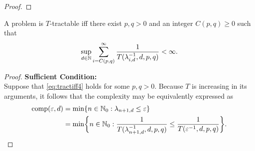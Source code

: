 \documentclass[11pt,a4paper]{article}
\begin{document}
{\begin{proof}
\end{proof}
\bigskip
\begin{theorem}\label{thm_main_strong_tract2} 
A problem is $T$-tractable iff there exist $p,q>0$ and an integer $C(p,q) \ge 0$ such that
\begin{equation} \label{eq:tractiff4}
     \sup_{d \in \mathbb{N}} \sum_{i = C(p,q)}^\infty \frac{1}{T(\lambda^{-1}_{i,d},d,p,q)}< \infty.
\end{equation}

\end{theorem}

\begin{proof}
    \textbf{Sufficient Condition:}\\ Suppose that \eqref{eq:tractiff4} holds for some $p,q>0$. 
Because $T$ is increasing in its arguments, it follows that the complexity may be equivalently expressed as 
\begin{align*}
    \operatorname{comp}(\varepsilon, d) &= \min \{n \in \mathbb{N}_{0} : \lambda_{n+1, d} \le \varepsilon\} \\
    &= \min \biggl\{n \in \mathbb{N}_{0} : \frac{1}{T(\lambda_{n+1, d}^{-1},d,p,q)} \le \frac{1}{T(\varepsilon^{-1},d,p,q)} \biggr\}.
\end{align*}


\end{proof}}
\end{document}
